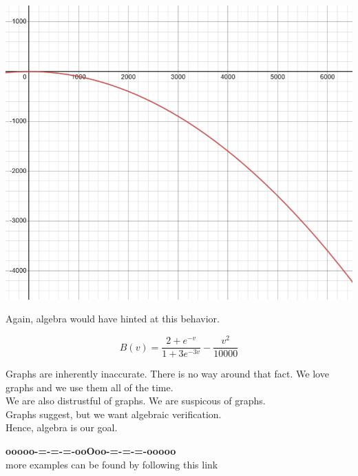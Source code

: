 \documentclass{ximera}
\begin{document}
\begin{example}
\begin{image}
\includegraphics{pics/graph_4B.png}
\end{image}





Again, algebra would have hinted at this behavior.

\[  B(v) = \frac{2+e^{-v}}{1+3 e^{-3v}} -\frac{v^2}{10000}     \]


\end{example}



Graphs are inherently inaccurate.  There is no way around that fact.  We love graphs and we use them all of the time. \\

We are also distrustful of graphs.  We are suspicous of graphs. \\

Graphs suggest, but we want algebraic verification. \\

Hence, algebra is our goal.












\begin{onlineOnly}
\begin{center}
\textbf{\textcolor{green!50!black}{ooooo-=-=-=-ooOoo-=-=-=-ooooo}} \\

more examples can be found by following this link\\ 

\end{center}
\end{onlineOnly}
\end{document}
